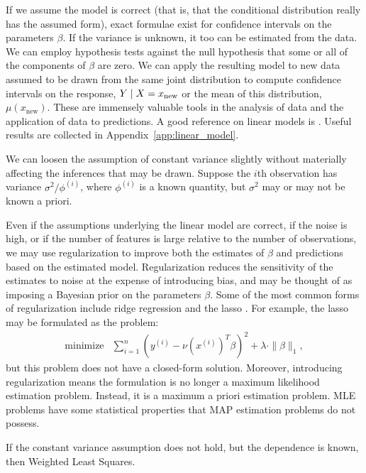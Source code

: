 \documentclass[12pt]{article}
\begin{document}
If we assume the model is correct (that is, that the conditional distribution really has the assumed form), exact formulae exist for confidence intervals on the parameters $\beta$. If the variance is unknown, it too can be estimated from the data. We can employ hypothesis tests against the null hypothesis that some or all of the components of $\beta$ are zero. We can apply the resulting model to new data assumed to be drawn from the same joint distribution to compute confidence intervals on the response, $Y \; | \; X = x_\textrm{new}$ or the mean of this distribution, $\mu(x_\textrm{new})$. These are immensely valuable tools in the analysis of data and the application of data to predictions. A good reference on linear models is \cite{Weisberg:2005}. Useful results are collected in Appendix~\ref{app:linear_model}.

We can loosen the assumption of constant variance slightly without materially affecting the inferences that may be drawn. Suppose the $i$th observation has variance $\sigma^2 / \phi^{(i)}$, where $\phi^{(i)}$ is a known quantity, but $\sigma^2$ may or may not be known a priori.

Even if the assumptions underlying the linear model are correct, if the noise is high, or if the number of features is large relative to the number of observations, we may use regularization to improve both the estimates of $\beta$ and predictions based on the estimated model. Regularization reduces the sensitivity of the estimates to noise at the expense of introducing bias, and may be thought of as imposing a Bayesian prior on the parameters $\beta$. Some of the most common forms of regularization include ridge regression and the lasso \cite{Tibs:96}. For example, the lasso may be formulated as the problem:
\begin{displaymath}
        \begin{array}{ll}
            \mbox{minimize} & {\displaystyle \sum_{i=1}^n} \left( y^{(i)} - \nu \left(x^{(i)} \right)^T \beta \right)^2 + \lambda \cdot \| \beta \|_1,
        \end{array}
\end{displaymath}
but this problem does not have a closed-form solution. Moreover, introducing regularization means the formulation is no longer a maximum likelihood estimation problem. Instead, it is a maximum a priori estimation problem. MLE problems have some statistical properties that MAP estimation problems do not possess.

If the constant variance assumption does not hold, but the dependence is known, then Weighted Least Squares.
\end{document}
